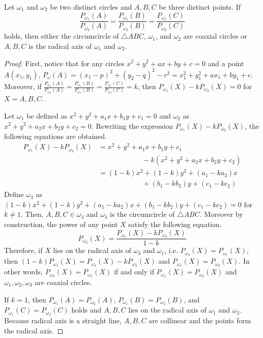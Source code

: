 \documentclass[../../../main.tex]{subfiles}
\begin{document}
\begin{theorem}{}{}
Let $\omega_1$ and $\omega_2$ be two distinct circles and $A, B, C$
be three distinct points. If
\[
\frac{P_{\omega_1}(A)}{P_{\omega_2}(A)}
= \frac{P_{\omega_1}(B)}{P_{\omega_2}(B)}
= \frac{P_{\omega_1}(C)}{P_{\omega_2}(C)}
\]
holds, then either the circumcircle of $\triangle{ABC}$, $\omega_1$,
and $\omega_2$ are coaxial circles or $A, B, C$ is the radical
axis of $\omega_1$ and $\omega_2$.
\end{theorem}
\begin{proof}
First, notice that for any circles $x^2 + y^2 + ax + by + c = 0$
and a point $A(x_1, y_1)$, $P_\omega(A) = (x_1 - p)^2 + (y_2 - q)^2
- r^2 = x_1^2 + y_1^2 + ax_1 + by_1 + c$. Moreover, if
$\frac{P_{\omega_1}(A)}{P_{\omega_2}(A)}
= \frac{P_{\omega_1}(B)}{P_{\omega_2}(B)}
= \frac{P_{\omega_1}(C)}{P_{\omega_2}(C)} = k$, then
$P_{\omega_1}(X) - k P_{\omega_2}(X) = 0$ for $X = A, B, C$.

Let $\omega_1$ be defined as $x^2 + y^2 + a_1x + b_1y + c_1 = 0$ and
$\omega_2$ as $x^2 + y^2 + a_2x + b_2y + c_2 = 0$. Rewriting the
expression $P_{\omega_1}(X) - k P_{\omega_2}(X)$, the following
equations are obtained.
\begin{align*}
    P_{\omega_1}(X) - k P_{\omega_2}(X)
    &= x^2 + y^2 + a_1x + b_1y + c_1 \\
    &\qquad\qquad\qquad\,- k(x^2 + y^2 + a_2x + b_2y + c_2) \\
    &= (1 - k) x^2 + (1 - k) y^2 + (a_1 - ka_2) x \\
    &\qquad\qquad\qquad\,+ (b_1 - kb_2) y + (c_1 - kc_2)
\end{align*}
Define $\omega_3$ as $(1 - k) x^2 + (1 - k) y^2 + (a_1 - ka_2) x +
(b_1 - kb_2) y + (c_1 - kc_2) = 0$ for $k \neq 1$. Then, $A, B, C
\in \omega_3$ and $\omega_3$ is the circumcircle of $\triangle{ABC}$.
Moreover by construction, the power of any point $X$ satisfy the
following equation.
\[
P_{\omega_3}(X)
= \frac{P_{\omega_1}(X) - k P_{\omega_2}(X)}{1 - k}
\]
Therefore, if $X$ lies on the radical axis of $\omega_3$ and
$\omega_1$, i.e. $P_{\omega_3}(X) = P_{\omega_1}(X)$, then
$(1 - k) P_{\omega_1}(X) = P_{\omega_1}(X) - k P_{\omega_2}(X)$
and $P_{\omega_1}(X) = P_{\omega_2}(X)$. In other words,
$P_{\omega_3}(X) = P_{\omega_1}(X)$ if and only if $P_{\omega_1}(X) =
P_{\omega_2}(X)$ and $\omega_1, \omega_2, \omega_3$ are coaxial
circles.

If $k = 1$, then $P_{\omega_1}(A) = P_{\omega_2}(A)$,
$P_{\omega_1}(B) = P_{\omega_2}(B)$, and $P_{\omega_1}(C) =
P_{\omega_2}(C)$ holds and $A, B, C$ lies on the radical axis of
$\omega_1$ and $\omega_2$. Because radical axis is a straight line,
$A, B, C$ are collinear and the points form the radical axis.
\end{proof}
\end{document}

